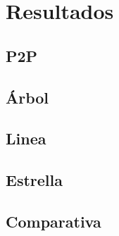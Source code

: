 %
\chapter{Resultados}
\label{ch::chapter5}

\section{P2P}

\section{Árbol}

\section{Linea}

\section{Estrella}

\section{Comparativa}